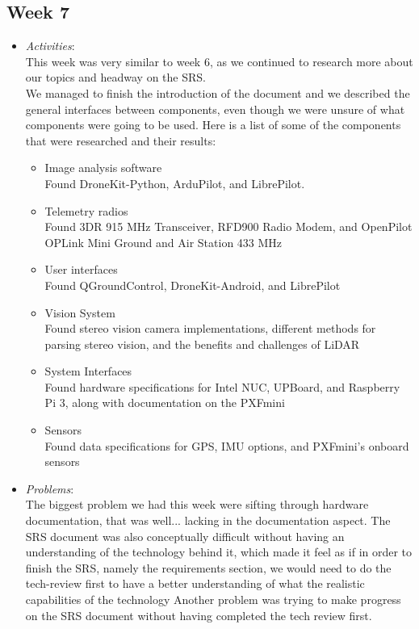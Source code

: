 \documentclass[compsoc,draftclsnofoot,onecolumn,10pt]{IEEEtran}
\begin{document}
\subsection{Week 7}
	\begin{itemize}
        \item \textit{Activities}:\\
        This week was very similar to week 6, as we continued to research more about our topics and headway on the SRS.\\ 
        We managed to finish the introduction of the document and we described the general interfaces between components, even though we were unsure of what components were going to be used. 
        Here is a list of some of the components that were researched and their results:
        \begin{itemize}
            \item Image analysis software\\
    	    Found DroneKit-Python, ArduPilot, and LibrePilot.
    	    \item Telemetry radios \\
    	    Found 3DR 915 MHz Transceiver, RFD900 Radio Modem, and OpenPilot OPLink Mini Ground and Air Station 433 MHz
    	    \item User interfaces\\
    	    Found QGroundControl, DroneKit-Android, and LibrePilot
    	    \item Vision System \\
    	    Found stereo vision camera implementations, different methods for parsing stereo vision, and the benefits and challenges of LiDAR
    	    \item System Interfaces \\
    	    Found hardware specifications for Intel NUC, UPBoard, and Raspberry Pi 3, along with documentation on the PXFmini
    	    \item Sensors\\
    	    Found data specifications for GPS, IMU options, and PXFmini's onboard sensors
        \end{itemize}
        \item \textit{Problems}:\\
        The biggest problem we had this week were sifting through hardware documentation, that was well... lacking in the documentation aspect. 
        The SRS document was also conceptually difficult without having an understanding of the technology behind it, which made it feel as if in order to finish the SRS, namely the requirements section, we would need to do the tech-review first to have a better understanding of what the realistic capabilities of the technology 
        Another problem was trying to make progress on the SRS document without having completed the tech review first.
        

\end{itemize}
\end{document}
